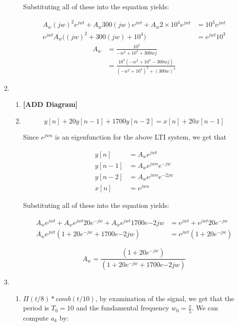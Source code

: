 \documentclass[]{article}
\begin{document}
\begin{enumerate}
\begin{enumerate}
    Substituting all of these into the equation yields:

    \begin{align*}
        A_w (jw)^2 e^{jwt} + A_w 300 (jw) e^{jwt} + A_w 2 \times 10^4 e^{jwt} &= 
            10^3 e^{jwt} \\
        e^{jwt} A_w \Big( (jw)^2 + 300(jw) + 10^4 \Big) &= e^{jwt} 10^3
    \end{align*}\begin{align*}
        A_w &= \frac{10^3}{-w^2 + 10^4 + 300 w j} \\
            &= \boxed{\frac{10^3 (-w^2 + 10^4 - 300wj)}{ (-w^2 + 10^4)^2 + (300 w)^2}}
    \end{align*}
  \end{enumerate}
\item
  \begin{enumerate}
  \def\labelenumii{\alph{enumii}.}
  \item
    \textbf{{[}ADD Diagram{]}}
  \item
    \[
        y[n] + 20 y[n - 1] + 1700 y[n - 2] = x[n] + 20x[n-1]
    \]

    Since \(e^{jwn}\) is an eigenfunction for the above LTI system, we
    get that

    \begin{align*}
        y[n] &= A_w e^{jwt} \\
        y[n - 1] &= A_w e^{jwn} e^{-jw} \\
        y[n - 2] &= A_w  e^{jwn} e^{-2jw} \\
        x[n] &= e^{jwn}
    \end{align*}

    Substituting all of these into the equation yields:

    \begin{align*}
        A_w e^{jwt} + A_w e^{jwt}20  e^{-jw} + A_w e^{jwt} 1700 e{-2jw} &= 
            e^{jwt} + e^{jwt} 20 e^{-jw} \\
        A_w e^{jwt}(1 +  20  e^{-jw} + 1700 e{-2jw}) &=
            e^{jwt}(1 + 20e^{-jw})
    \end{align*}

    \[
        \boxed{A_w = \frac{(1 + 20e^{-jw})}{(1 +  20  e^{-jw} + 1700 e{-2jw})}}
    \]
  \end{enumerate}
\item
  \begin{enumerate}
  \def\labelenumii{\alph{enumii}.}
  \item
    \(\Pi(t / 8) * comb(t / 10)\), by examination of the signal, we get
    that the period is \(T_0 = 10\) and the fundamental frequency
    \(\boxed{w_0 = \frac{\pi}{5}}\). We can compute \(a_k\) by:


\end{enumerate}
\end{enumerate}
\end{document}
